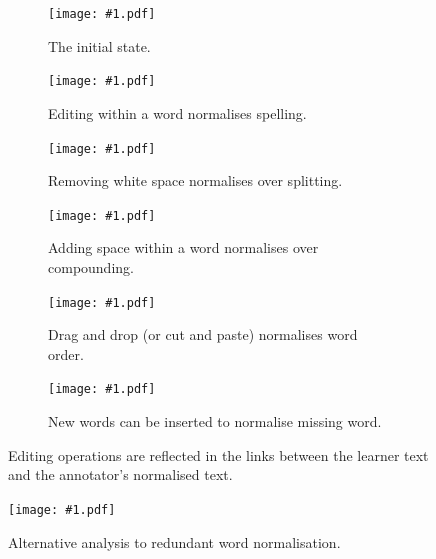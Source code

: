 \documentclass[10pt, a4paper]{article}
\begin{document}
\begin{figure}
\centering
\newcommand{\features}[2]{
\begin{subfigure}[t]{0.5\textwidth}
\texttt{[image: \#1.pdf]}
\caption{#2 \label{fig:#1}}
\end{subfigure}
}
\features{features0}{The initial state.}
\features{features1}{Editing within a word normalises spelling.}
\features{features2}{Removing white space normalises over splitting.}
\features{features3}{Adding space within a word normalises over compounding.}
\features{features4}{Drag and drop (or cut and paste) normalises word order.}
\features{features5}{New words can be inserted to normalise missing word.}
\caption{Editing operations are reflected in the links
between the learner text and the annotator's normalised text.}
\end{figure}

\newcommand{\featuresF}[2]{
\begin{figure}[t]
\texttt{[image: \#1.pdf]}
\caption{#2 \label{fig:#1}}
\end{figure}
}
\featuresF{features6}{Alternative analysis to redundant word normalisation.}
\end{document}
